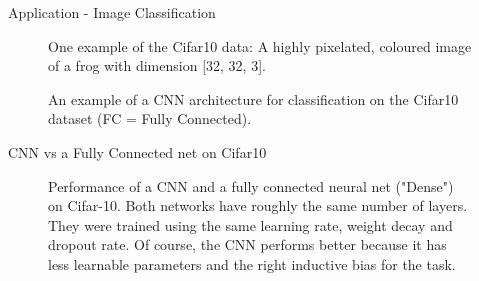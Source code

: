\begin{vbframe}{Application - Image Classification}
\begin{figure}
        \caption{One example of the Cifar10 data: A highly pixelated, coloured image of a frog with dimension [32, 32, 3]. }
    \end{figure}
\framebreak
    \begin{figure}
        \centering
        \caption{An example of a CNN architecture for classification on the Cifar10 dataset (FC = Fully Connected). }
    \end{figure}  
\end{vbframe}

\begin{frame} {CNN vs a Fully Connected net on Cifar10}
  \begin{figure}
        \centering
        \caption{Performance of a CNN and a fully connected neural net ("Dense") on Cifar-10. Both networks have roughly the same number of layers. They were trained using the same learning rate, weight decay and dropout rate. Of course, the CNN performs better because it has less learnable parameters and the right inductive bias for the task.}
    \end{figure} 
\end{frame}

